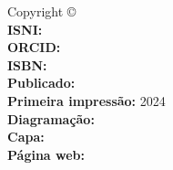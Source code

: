 
\newpage
\thispagestyle{empty}

{%
\noindent Copyright \copyright\ \BookEditionYear\ \BookAuthor\\ %
\noindent \textbf{ISNI:} \AuthorNumberISNI\\
\noindent \textbf{ORCID:} \AuthorNumberOrcid\\


\noindent \textbf{ISBN:} \BookEditionISBN\\ %
\noindent \textbf{Publicado:} \BookPublishingEditor\\ %
\noindent \textbf{Primeira impressão:} 2024\\ %
\noindent \textbf{Diagramação:} \BookAuthor\\ %
\noindent \textbf{Capa:} \BookAuthor\\ %
\noindent \textbf{Página web:} \BookHomePage\\ %
\vfill



{
\SetBookAuthorLastName{\BookAuthorLastName}
\SetBookAuthorName{\BookAuthorName}
\SetBookAuthorYearBorn{\BookAuthorYearBorn}
\SetBookTitle{\BookTitle}
\SetBookSubTitle{\BookSubTitle}
\SetBookPublishingPlace{\BookLocalCountry}
\SetBookPublishingEditor{\BookPublishingEditor}
\SetBookPublishingYear{\BookEditionYear}
\SetBookPaperSize{\BookPaperWidth$\times$\BookPaperHeight}
\SetBookHasBibliography{\BookHasBibliography}
\SetBookISBN{\BookEditionISBN}
\SetBookKeyWordA{\BookKeyWordA}
\SetBookKeyWordB{\BookKeyWordB}
\SetBookKeyWordC{\BookKeyWordC}
\SetBookCDD{\BookCDD}
\SetBookCDU{\BookCDU}
\tiny
\centering
\CatalographicCard{12.5cm}
}
}
\newpage
